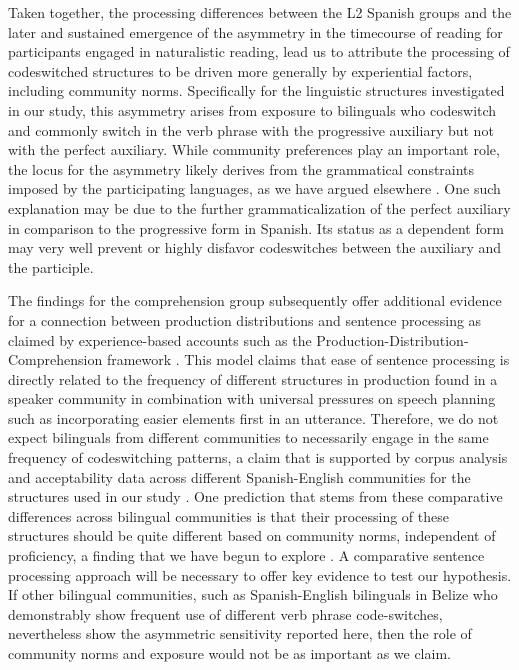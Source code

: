 \documentclass[output=paper,colorlinks,citecolor=brown]{langscibook}
\begin{document}
Taken together, the processing differences between the L2 Spanish groups and the later and sustained emergence of the asymmetry in the timecourse of reading for participants engaged in naturalistic reading, lead us to attribute the processing of codeswitched structures to be driven more generally by experiential factors, including community norms. Specifically for the linguistic structures investigated in our study, this asymmetry arises from exposure to bilinguals who codeswitch and commonly switch in the verb phrase with the progressive auxiliary but not with the perfect auxiliary. While community preferences play an important role, the locus for the asymmetry likely derives from the grammatical constraints imposed by the participating languages, as we have argued elsewhere \citep{GuzzardoTamargoetal2016,ValdesKroffDussias2023}. One such explanation may be due to the further grammaticalization of the perfect auxiliary in comparison to the progressive form in Spanish. Its status as a dependent form may very well prevent or highly disfavor codeswitches between the auxiliary and the participle.

The findings for the comprehension group subsequently offer additional evidence for a connection between production distributions and sentence processing as claimed by experience-based accounts such as the Production-Distribution-Comprehension framework \citep{MacDonald2013}. This model claims that ease of sentence processing is directly related to the frequency of different structures in production found in a speaker community in combination with universal pressures on speech planning such as incorporating easier elements first in an utterance. Therefore, we do not expect bilinguals from different communities to necessarily engage in the same frequency of codeswitching patterns, a claim that is supported by corpus analysis and acceptability data across different Spanish-English communities for the structures used in our study \citep{Balam2016,Balametal2020}. One prediction that stems from these comparative differences across bilingual communities is that their processing of these structures should be quite different based on community norms, independent of proficiency, a finding that we have begun to explore \citep{Treadwayetal2025}. A comparative sentence processing approach will be necessary to offer key evidence to test our hypothesis. If other bilingual communities, such as Spanish-English bilinguals in Belize who demonstrably show frequent use of different verb phrase code-switches, nevertheless show the asymmetric sensitivity reported here, then the role of community norms and exposure would not be as important as we claim.
\end{document}
